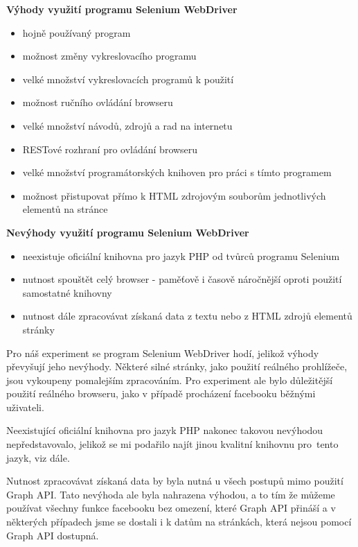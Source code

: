 \documentclass[thesis=M,czech]{FITthesis}[2013/05/10]
\begin{document}
\textbf{Výhody využití programu Selenium WebDriver}

\begin{itemize}
  \item hojně používaný program
  \item možnost změny vykreslovacího programu
  \item velké množství vykreslovacích programů k použití
  \item možnost ručního ovládání browseru
  \item velké množství návodů, zdrojů a rad na internetu
  \item RESTové rozhraní pro ovládání browseru
  \item velké množství programátorských knihoven pro práci s tímto programem
  \item možnost přistupovat přímo k HTML zdrojovým souborům jednotlivých elementů na stránce
\end{itemize}

\textbf{Nevýhody využití programu Selenium WebDriver}

\begin{itemize}
  \item neexistuje oficiální knihovna pro jazyk PHP 
  od tvůrců programu Selenium
  \item nutnost spouštět celý browser - paměťově i časově náročnější
  oproti použití samostatné knihovny
  \item nutnost dále zpracovávat získaná data z textu nebo z HTML zdrojů elementů stránky
\end{itemize}

Pro náš experiment se program Selenium WebDriver hodí, jelikož výhody převyšují jeho nevýhody. Některé silné stránky, jako použití reálného prohlížeče, jsou vykoupeny pomalejším zpracováním. Pro experiment ale bylo důležitější použití reálného browseru, jako v případě procházení facebooku běžnými uživateli.

Neexistující oficiální knihovna pro jazyk PHP nakonec takovou nevýhodou nepředstavovalo, jelikož se mi podařilo najít jinou kvalitní knihovnu pro~tento jazyk, viz dále.

Nutnost zpracovávat získaná data by byla nutná u všech postupů mimo použití Graph API. Tato nevýhoda ale byla nahrazena výhodou, a to tím že můžeme používat všechny funkce facebooku bez omezení, které Graph API přináší a v některých případech jsme se dostali i k datům na stránkách, která nejsou pomocí Graph API dostupná.
\end{document}
